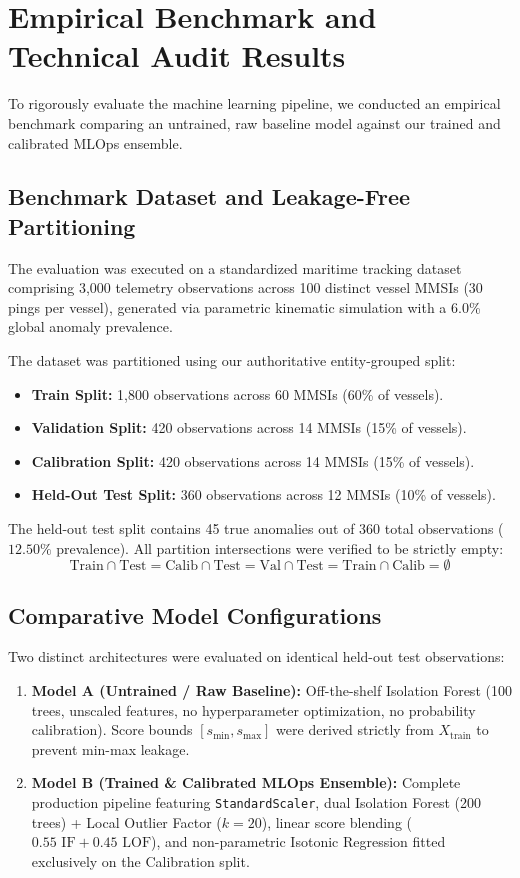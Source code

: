 \section{Empirical Benchmark and Technical Audit Results}
\label{sec:empirical_results}

To rigorously evaluate the machine learning pipeline, we conducted an empirical benchmark comparing an untrained, raw baseline model against our trained and calibrated MLOps ensemble.

\subsection{Benchmark Dataset and Leakage-Free Partitioning}
The evaluation was executed on a standardized maritime tracking dataset comprising 3,000 telemetry observations across 100 distinct vessel MMSIs (30 pings per vessel), generated via parametric kinematic simulation with a 6.0\% global anomaly prevalence.

The dataset was partitioned using our authoritative entity-grouped split:
\begin{itemize}[leftmargin=*]
    \item \textbf{Train Split:} 1,800 observations across 60 MMSIs (60\% of vessels).
    \item \textbf{Validation Split:} 420 observations across 14 MMSIs (15\% of vessels).
    \item \textbf{Calibration Split:} 420 observations across 14 MMSIs (15\% of vessels).
    \item \textbf{Held-Out Test Split:} 360 observations across 12 MMSIs (10\% of vessels).
\end{itemize}
The held-out test split contains 45 true anomalies out of 360 total observations ($12.50\%$ prevalence). All partition intersections were verified to be strictly empty:
\begin{equation}
\text{Train} \cap \text{Test} = \text{Calib} \cap \text{Test} = \text{Val} \cap \text{Test} = \text{Train} \cap \text{Calib} = \emptyset
\end{equation}

\subsection{Comparative Model Configurations}
Two distinct architectures were evaluated on identical held-out test observations:
\begin{enumerate}[leftmargin=*]
    \item \textbf{Model A (Untrained / Raw Baseline):} Off-the-shelf Isolation Forest (100 trees, unscaled features, no hyperparameter optimization, no probability calibration). Score bounds $[s_{\min}, s_{\max}]$ were derived strictly from $X_{\text{train}}$ to prevent min-max leakage.
    \item \textbf{Model B (Trained \& Calibrated MLOps Ensemble):} Complete production pipeline featuring \texttt{StandardScaler}, dual Isolation Forest (200 trees) + Local Outlier Factor ($k=20$), linear score blending ($0.55\text{ IF} + 0.45\text{ LOF}$), and non-parametric Isotonic Regression fitted exclusively on the Calibration split.
\end{enumerate}

